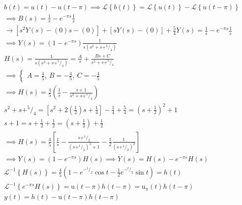 \documentclass[11pt,a4paper,titlepage,final]{article}
\begin{document}
\begin{exercise*}{13.2}
	\begin{gather*}
	b(t) = u(t) - u(t-\pi) \implies \mathscr L \left\lbrace b(t) \right\rbrace = \mathscr L \left\lbrace u(t) \right\rbrace - \mathscr L \left\lbrace u(t-\pi) \right\rbrace \\
	\implies B(s) = \frac{1}{s} - e^{-\pi s}\frac{1}{s}\\
	\mathscr \rightarrow \left[s^2Y(s)-(0)s-(0)\right]+\left[sY(s)-(0)\right] + \frac{5}{4}Y(s) = \frac{1}{s}-e^{-\pi s} \frac{1}{s} \\
	\implies Y(s) = \left(1-e^{-\pi s}\right) \frac{1}{s(s^2+s+^5/_4)}\\
H(s) = \frac{1}{s(s^2+s+^5/_4)} = \frac{A}{s}+\frac{Bs+C}{s^2+s+^5/_4} \\
\implies \begin{cases}
A = \frac{4}{5},\ B= -\frac{4}{5},\ C = -\frac{4}{5}
\end{cases}\\
\implies H(s) = \frac{4}{5} \left(
\frac{1}{s}-\frac{s+1}{s^2+s+^5/_4}\right) \\
s^2+s+^5/_4 = \left[s^2+2\left(\frac{1}{2}\right)s+\frac{1}{4}\right]-\frac{1}{4}+\frac{5}{4} = \left(s+\frac{1}{2}\right)^2+1 \\
s+1 = s +\frac{1}{2}+\frac{1}{2} = \left(s+\frac{1}{2}\right) + \frac{1}{2}\\
\implies H(s) = \frac{4}{5} \left[
\frac{1}{s}-\frac{s+^1/_2}{\left(s+^1/_2\right)^2+1}-\frac{1}{2}\frac{1}{\left(s+^1/_2\right)^2} \right] \\
\implies Y(s) = \left(1-e^{-\pi s}\right)H(s) \implies Y(s) = H(s) - e^{-\pi s} H(s) \\
\mathscr L^{-1} \left\lbrace H(s) \right\rbrace = \frac{4}{5} \left(
1-e^{-^t/_2}\cos t - \frac{1}{2}e^{-^t/_2}\sin t
\right) = h(t) \\
\mathscr L^{-1} \left\lbrace  e^{-\pi s}H(s)\right\rbrace  = \mathrm u(t-\pi)h(t-\pi) = \mathrm u_\pi(t)h(t-\pi)
\\ y(t) = h(t)-\mathrm u(t-\pi)h(t-\pi)
	\end{gather*}
\end{exercise*}
\end{document}
